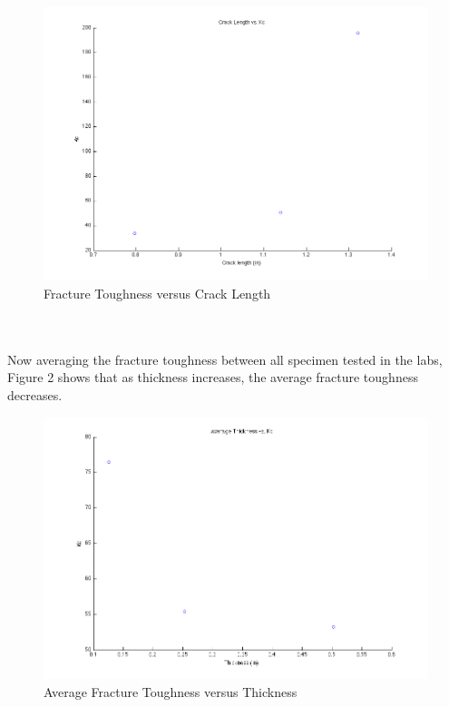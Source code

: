 \documentclass[12pt]{report}
\begin{document}
\begin{figure}[H]
	\includegraphics[width=1\textwidth]{crack_vs_kc.png}
	\caption{Fracture Toughness versus Crack Length}
	\label{fig:Figure1}
\end{figure}
\\
\\

Now averaging the fracture toughness between all specimen tested in the labs, Figure 2 shows that as thickness increases, the average fracture toughness decreases.

\begin{figure}[H]
	\includegraphics[width=1\textwidth]{avgt_vs_kc.png}
	\caption{Average Fracture Toughness versus Thickness}
	\label{fig:Figure2}
\end{figure}
\\
\\
\end{document}
